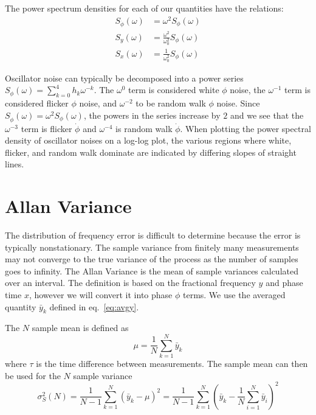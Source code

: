 The power spectrum densities for each of our quantities have the relations:
%
\begin{align}
S_{\dot{\phi}}(\omega) &= \omega^2 S_\phi(\omega) \\
S_y(\omega) &= \frac{\omega^2}{\omega_0^2}S_\phi(\omega) \\
S_x(\omega) &= \frac{1}{\omega_0^2}S_\phi(\omega)
\end{align}
%

Oscillator noise can typically be decomposed into a power series $S_\phi(\omega) = \sum_{k=0}^{4} h_k\omega^{-k}$. The $\omega^0$ term is considered white $\phi$ noise, the $\omega^{-1}$ term is considered flicker $\phi$ noise, and $\omega^{-2}$ to be random walk $\phi$ noise. Since $S_{\dot{\phi}}(\omega) = \omega^2 S_\phi(\omega)$, the powers in the series increase by $2$ and we see that the $\omega^{-3}$ term is flicker $\dot{\phi}$ and $\omega^{-4}$ is random walk $\dot{\phi}$. When plotting the power spectral density of oscillator noises on a log-log plot, the various regions where white, flicker, and random walk dominate are indicated by differing slopes of straight lines.



\section{Allan Variance} \label{sec:avar}

The distribution of frequency error is difficult to determine because the error is typically nonstationary.  The sample variance from finitely many measurements may not converge to the true variance of the process as the number of samples goes to infinity. The Allan Variance is the mean of sample variances calculated over an interval. The definition is based on the fractional frequency $y$ and phase time $x$, however we will convert it into phase $\phi$ terms. We use the averaged quantity $\bar{y}_k$ defined in eq.~\ref{eq:avgy}.

The $N$ sample mean is defined as
%
\begin{equation}
\mu = \frac{1}{N} \sum_{k=1}^{N} \bar{y}_k
\end{equation}
%
where $\tau$ is the time difference between measurements. The sample mean can then be used for the $N$ sample variance
%
\begin{equation}
\sigma_S^2(N) = \frac{1}{N-1} \sum_{k=1}^{N} \left(\bar{y}_k - \mu\right)^2 = \frac{1}{N-1} \sum_{k=1}^{N} \left(\bar{y}_k - \frac{1}{N} \sum_{i=1}^{N} \bar{y}_i\right)^2
\end{equation}
%

